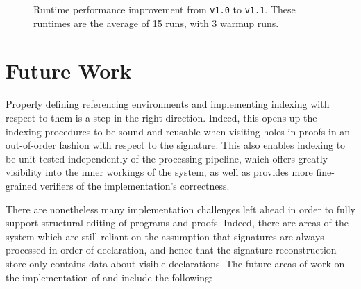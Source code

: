 \clearpage
\begin{figure}[H]
\centering
{}
\caption[Runtime performance improvement from \Beluga \texttt{v1.0} to \texttt{v1.1}]{%
Runtime performance improvement from \Beluga \texttt{v1.0} to \texttt{v1.1}.
These runtimes are the average of 15 runs, with 3 warmup runs.
}
\label{figure:runtime-improvement}
\end{figure}

\section{Future Work}

Properly defining referencing environments and implementing indexing with respect to them is a step in the right direction.
Indeed, this opens up the indexing procedures to be sound and reusable when visiting holes in \Harpoon proofs in an out-of-order fashion with respect to the \Beluga signature.
This also enables indexing to be unit-tested independently of the processing pipeline, which offers greatly visibility into the inner workings of the system, as well as provides more fine-grained verifiers of the implementation's correctness.

There are nonetheless many implementation challenges left ahead in order to fully support structural editing of \Beluga programs and \Harpoon proofs.
Indeed, there are areas of the system which are still reliant on the assumption that signatures are always processed in order of declaration, and hence that the signature reconstruction store only contains data about visible declarations.
The future areas of work on the implementation of \Beluga and \Harpoon include the following:

